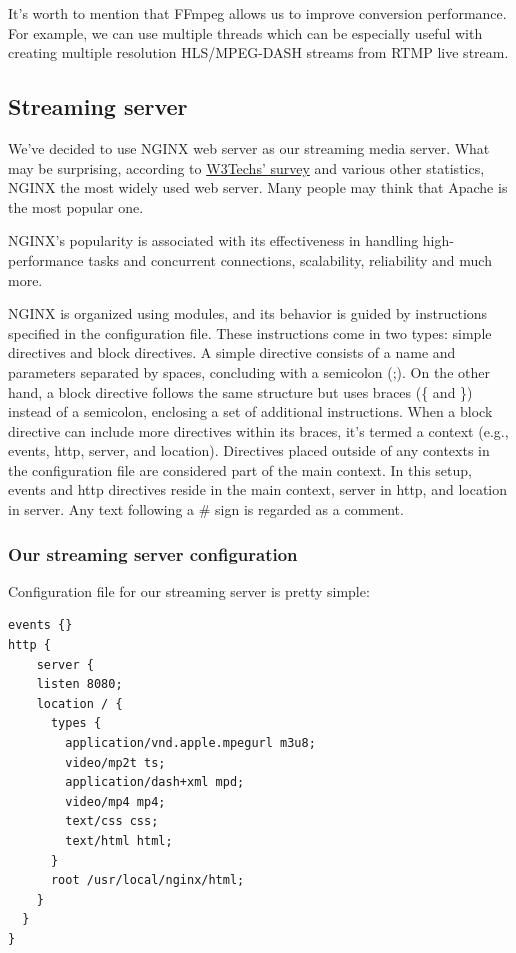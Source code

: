 \documentclass{article}
\begin{document}
It's worth to mention that FFmpeg allows us to improve conversion
performance. For example, we can use multiple threads which can be
especially useful with creating multiple resolution HLS/MPEG-DASH
streams from RTMP live stream.

\subsection{Streaming server}\label{streaming-server}

We've decided to use NGINX web server as our streaming media server.
What may be surprising, according to
\href{https://w3techs.com/technologies/overview/web_server}{W3Techs'
survey} and various other statistics, NGINX the most widely used web
server. Many people may think that Apache is the most popular one.

NGINX's popularity is associated with its effectiveness in handling
high-performance tasks and concurrent connections, scalability,
reliability and much more.

NGINX is organized using modules, and its behavior is guided by
instructions specified in the configuration file. These instructions
come in two types: simple directives and block directives. A simple
directive consists of a name and parameters separated by spaces,
concluding with a semicolon (;). On the other hand, a block directive
follows the same structure but uses braces (\{ and \}) instead of a
semicolon, enclosing a set of additional instructions. When a block
directive can include more directives within its braces, it's termed a
context (e.g., events, http, server, and location). Directives placed
outside of any contexts in the configuration file are considered part of
the main context. In this setup, events and http directives reside in
the main context, server in http, and location in server. Any text
following a \# sign is regarded as a comment.

\subsubsection{Our streaming server
configuration}\label{our-streaming-server-configuration}

Configuration file for our streaming server is pretty simple:

\begin{verbatim}
events {}
http {
	server {
    listen 8080;
    location / {
      types {
        application/vnd.apple.mpegurl m3u8;
        video/mp2t ts;
        application/dash+xml mpd;
        video/mp4 mp4;
        text/css css;
        text/html html;
      }
	  root /usr/local/nginx/html;
    }
  }
}
\end{verbatim}
\end{document}
